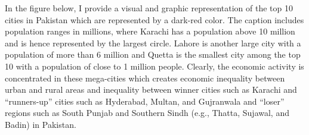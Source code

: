 \documentclass[12pt]{article}
\newcommand{\1}{\mathbbm 1}
\begin{document}
		
		
		In the figure below, I provide a visual and graphic representation of the top 10 cities in Pakistan which are represented by a dark-red color. The caption includes population ranges in millions, where Karachi has a population above 10 million and is hence represented by the largest circle. Lahore is another large city with a population of more than 6 million and Quetta is the smallest city among the top 10 with a population of close to 1 million people. Clearly, the economic activity is concentrated in these mega-cities which creates economic inequality between urban and rural areas and inequality between winner cities such as Karachi and ``runners-up'' cities such as Hyderabad, Multan, and Gujranwala and ``loser'' regions such as South Punjab and Southern Sindh (e.g., Thatta, Sujawal, and Badin) in Pakistan. 
		
		
		
		
		
		
		
		
\end{document}
